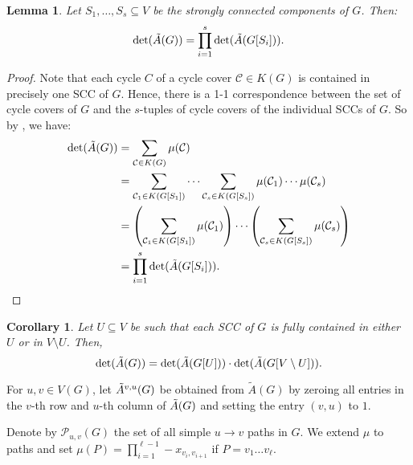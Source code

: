 \documentclass[11pt]{article}
\newtheorem{corollary}[theorem]{Corollary}
\newtheorem{lemma}[theorem]{Lemma}
\begin{document}
{  
\begin{lemma}\label{l:det-scc}
  Let $S_1,\ldots,S_s\subseteq V$ be the strongly connected components of $G$. 
  Then:
  \begin{equation*}
      \det(\tilde{A}(G))=\prod_{i=1}^s \det(\tilde{A}(G[S_i])).
  \end{equation*}
\end{lemma}
\begin{proof}
  Note that each cycle $C$ of a cycle cover $\mathcal{C}\in K(G)$ is contained in precisely
  one SCC of $G$. Hence, there is a 1-1 correspondence between the set of cycle
  covers of $G$ and the $s$-tuples of cycle covers of the individual SCCs of $G$.
  So by , we have:
  \begin{align*}
    \det(\tilde{A}(G))&=\sum_{\mathcal{C}\in K(G)} \mu(\mathcal{C})\\
                   &=\sum_{\mathcal{C}_1\in K(G[S_1])}\cdots \sum_{\mathcal{C}_s\in K(G[S_s])}\mu(\mathcal{C}_1)\cdots\mu(\mathcal{C}_s)\\
                   &=\left(\sum_{\mathcal{C}_1\in K(G[S_1])}\mu(\mathcal{C}_1)\right)\cdots \left(\sum_{\mathcal{C}_s\in K(G[S_s])}\mu(\mathcal{C}_s)\right)\\
                   &=\prod_{i=1}^s \det(\tilde{A}(G[S_i])). \qedhere
  \end{align*}
\end{proof}
\begin{corollary}\label{l:det-scc-split}
Let $U\subseteq V$ be such that each SCC of $G$
  is fully contained in either $U$ or in $V\setminus U$.
  Then, 
  \begin{equation*}
      \det(\tilde{A}(G))=\det(\tilde{A}(G[U]))\cdot \det(\tilde{A}(G[V\setminus U])).
  \end{equation*}
\end{corollary}


For $u,v\in V(G)$, let $\tilde{A}^{v,u}(G)$ be obtained from $\tilde{A}(G)$ by zeroing all entries
in the $v$-th row and $u$-th column of $\tilde{A}(G)$ and setting the entry $(v,u)$ to $1$.

Denote by $\mathcal{P}_{u,v}(G)$ the set of all simple $u\to v$ paths in $G$. We extend $\mu$ to paths and
set $\mu(P)=\prod_{i=1}^{\ell-1}-x_{v_i,v_{i+1}}$ if $P=v_1\ldots v_\ell$.

}
\end{document}
